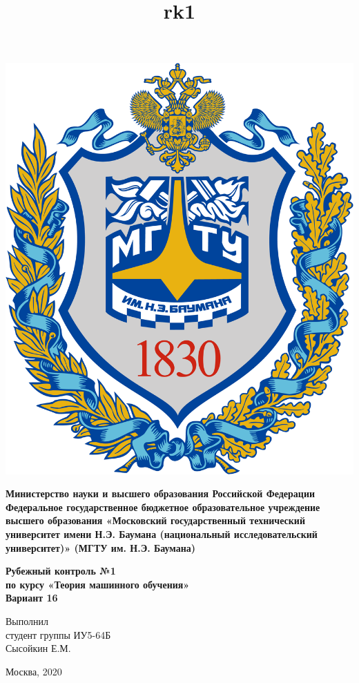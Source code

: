 \documentclass[11pt, a4paper]{report}
\title{rk1}
\begin{document}
    
	\begin{titlepage}
		\begin{minipage}{0.3\textwidth}
		\includegraphics{logo.png}	
		\end{minipage}
		\begin{minipage}{0.6\textwidth}\centering
			\textbf{
				Министерство науки и высшего образования Российской Федерации
				Федеральное государственное бюджетное образовательное 
				учреждение высшего образования
				«Московский государственный технический университет
				имени Н.Э. Баумана (национальный исследовательский университет)»
				(МГТУ им. Н.Э. Баумана)
			}	
		\end{minipage}
	
		\vspace{4cm}
		\centering
		\Large
		\textbf{
			Рубежный контроль №1 \\
			по курсу «Теория машинного обучения» \\
			Вариант 16
		}

		\vspace{4cm}
		\begin{flushright}
			Выполнил \\ 
			студент группы ИУ5-64Б \\ 
			Сысойкин Е.М. 
		\end{flushright}
		\vspace{4cm}
		Москва, 2020
	\end{titlepage}
    
\end{document}
